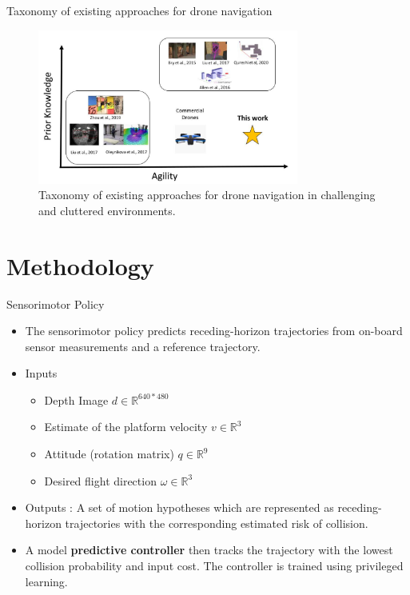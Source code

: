 \documentclass{beamer}
\begin{document}
\begin{frame}{Taxonomy of existing approaches for drone navigation}
	\centering
	\begin{figure}
		\includegraphics[height=2in]{images/taxonomy_navigation.png}
		\caption{Taxonomy of existing approaches for drone navigation in challenging and cluttered environments.}
	\end{figure}
\end{frame}

\section{Methodology}
\begin{frame}{Sensorimotor Policy}
	\begin{itemize}
		\item The sensorimotor policy predicts receding-horizon \autocite{receding_horizon} trajectories from on-board sensor measurements and a reference trajectory.
		
		\item Inputs
		\begin{itemize}
			\item Depth Image $d \in \mathbb{R}^{640*480}$
			\item Estimate of the platform velocity $v \in \mathbb{R}^3$
			\item Attitude (rotation matrix) $q \in \mathbb{R}^9$
			\item Desired flight direction $\omega \in \mathbb{R}^3$
		\end{itemize}
	
		\item Outputs : A set of motion hypotheses which are represented as
receding-horizon trajectories with the corresponding estimated risk of collision. 
		
		\item A model \textbf{predictive controller} then tracks the trajectory with
the lowest collision probability and input cost. The controller is trained
		using privileged learning.
		
		
	\end{itemize}
\end{frame}
\end{document}
